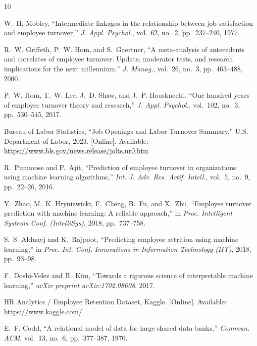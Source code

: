 \documentclass[conference]{IEEEtran}
\begin{document}
\begin{thebibliography}{10}

W.~H. Mobley, ``Intermediate linkages in the relationship between job
satisfaction and employee turnover,'' \textit{J. Appl. Psychol.}, vol.~62,
no.~2, pp.~237--240, 1977.

R.~W. Griffeth, P.~W. Hom, and S.~Gaertner, ``A meta-analysis of antecedents
and correlates of employee turnover: Update, moderator tests, and research
implications for the next millennium,'' \textit{J. Manag.}, vol.~26, no.~3,
pp.~463--488, 2000.

P.~W. Hom, T.~W. Lee, J.~D. Shaw, and J.~P. Hausknecht, ``One hundred years
of employee turnover theory and research,'' \textit{J. Appl. Psychol.},
vol.~102, no.~3, pp.~530--545, 2017.

Bureau of Labor Statistics, ``Job Openings and Labor Turnover Summary,''
U.S. Department of Labor, 2023. [Online]. Available:
\url{https://www.bls.gov/news.release/jolts.nr0.htm}

R.~Punnoose and P.~Ajit, ``Prediction of employee turnover in organizations
using machine learning algorithms,'' \textit{Int. J. Adv. Res. Artif.
Intell.}, vol.~5, no.~9, pp.~22--26, 2016.

Y.~Zhao, M.~K. Hryniewicki, F.~Cheng, B.~Fu, and X.~Zhu, ``Employee turnover
prediction with machine learning: A reliable approach,'' in \textit{Proc.
Intelligent Systems Conf. (IntelliSys)}, 2018, pp.~737--758.

S.~S. Alduayj and K.~Rajpoot, ``Predicting employee attrition using machine
learning,'' in \textit{Proc. Int. Conf. Innovations in Information Technology
(IIT)}, 2018, pp.~93--98.

F.~Doshi-Velez and B.~Kim, ``Towards a rigorous science of interpretable
machine learning,'' \textit{arXiv preprint arXiv:1702.08608}, 2017.

HR Analytics / Employee Retention Dataset, Kaggle. [Online]. Available:
\url{https://www.kaggle.com/}

E.~F. Codd, ``A relational model of data for large shared data banks,''
\textit{Commun. ACM}, vol.~13, no.~6, pp.~377--387, 1970.

\end{thebibliography}
\end{document}
